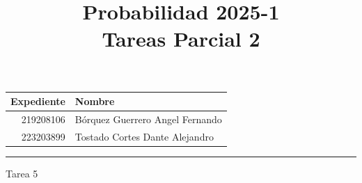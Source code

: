 \documentclass[a4paper, 12pt]{article}
\title
{
    Probabilidad 2025-1 \\
    Tareas Parcial 2
    }
\begin{document}
    \maketitle

    \begin{center}
        \begin{tabular}{r|l}
            \textbf{Expediente} & \textbf{Nombre} \\ \hline
            219208106 & Bórquez Guerrero Angel Fernando \\
            223203899 & Tostado Cortes Dante Alejandro \\
        \end{tabular}
    \end{center}

    \rule{\linewidth}{0.3mm}



    \vspace{0.3cm}

    \begin{center}
        { \LARGE Tarea 5}
    \end{center}
\end{document}
